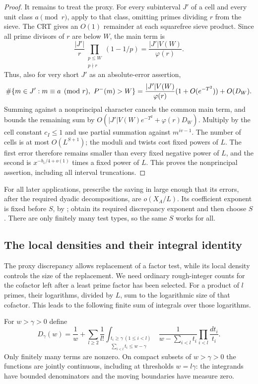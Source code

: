 \begin{proof}
It remains to treat the proxy. For every subinterval $J'$ of a
cell and every unit class $a\pmod r$, apply  to
that class, omitting primes dividing $r$ from the sieve. The CRT
gives an $O(1)$ remainder at each squarefree sieve product. Since
all prime divisors of $r$ are below $W$, the main term is
\[
 \frac{|J'|}{r}\prod_{\substack{p\le W\\p\nmid r}}(1-1/p)
 =\frac{|J'|V(W)}{\varphi(r)}.
\]
Thus, also for very short $J'$ as an absolute-error assertion,
\begin{equation}\label{eq:rough-class-count}
 \#\{m\in J':m\equiv a\pmod r,\ P^{-}(m)>W\}
 =\frac{|J'|V(W)}{\varphi(r)}(1+O(e^{-T^2}))+O(D_W).
\end{equation}
Summing against a nonprincipal character cancels the common main
term, and bounds the remaining sum by
$O(|J'|V(W)e^{-T^2}+\varphi(r)D_W)$. Multiply by the cell constant
$c_I\le1$ and use partial summation against $m^{iv-1}$.
The number of cells is at most $O(L^{S+1})$; the moduli and twists
cost fixed powers of $L$. The first error therefore remains
smaller than every fixed negative power of $L$, and the second
is $x^{-b_1/4+o(1)}$ times a fixed power of $L$. This proves the
nonprincipal assertion, including all interval truncations.
\end{proof}

For all later applications, prescribe the saving in
 large enough that its errors, after the required
dyadic decompositions, are $o(X_A/L)$. Its coefficient exponent
is fixed before $S$, by ; obtain its
required discrepancy exponent and then choose $S$. There are
only finitely many test types, so the same $S$ works for all.

\subsection{The local densities and their integral identity}

The proxy discrepancy allows replacement of a factor test, while its
local density controls the size of the replacement. We need ordinary
rough-integer counts for the cofactor left after a least prime factor
has been selected. For a product of $l$ primes, their logarithms,
divided by $L$, sum to the logarithmic size of that cofactor. This
leads to the following finite sum of integrals over those logarithms.

For $w>\gamma>0$ define
\begin{equation}\label{eq:rough-density-definition}
 D_\gamma(w)=\frac1w+
 \sum_{l\ge2}\frac1{l!}
  \int_{\substack{t_i\ge\gamma\ (1\le i<l)\\
                    \sum_{i<l}t_i\le w-\gamma}}
  \frac1{w-\sum_{i<l}t_i}\prod_{i<l}\frac{dt_i}{t_i}.
\end{equation}
Only finitely many terms are nonzero. On compact subsets of
$w>\gamma>0$ the functions are jointly continuous, including at
thresholds $w=l\gamma$: the integrands have bounded denominators
and the moving boundaries have measure zero.

